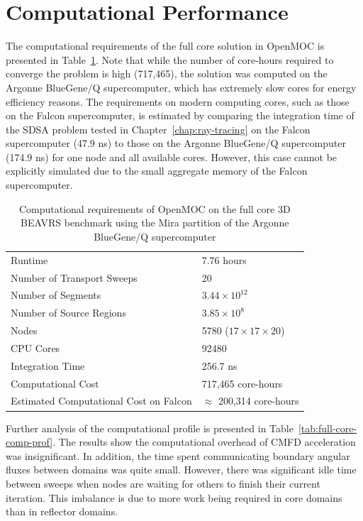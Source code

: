 \section{Computational Performance}
\label{sec:fc-computational-performance}

The computational requirements of the full core solution in OpenMOC is presented in Table~\ref{tab:full-core-comp-req}. Note that while the number of core-hours required to converge the problem is high (717,465), the solution was computed on the Argonne BlueGene/Q supercomputer, which has extremely slow cores for energy efficiency reasons. The requirements on modern computing cores, such as those on the Falcon supercomputer, is estimated by comparing the integration time of the SDSA problem tested in Chapter~\ref{chap:ray-tracing} on the Falcon supercomputer (47.9 ns) to those on the Argonne BlueGene/Q supercomputer (174.9 ns) for one node and all available cores. However, this case cannot be explicitly simulated due to the small aggregate memory of the Falcon supercomputer.

\begin{table}[ht]
	\centering
	\caption{Computational requirements of OpenMOC on the full core 3D BEAVRS benchmark using the Mira partition of the Argonne BlueGene/Q supercomputer}
	\medskip
	\begin{tabular}{l|l}
		\hline
		Runtime & 7.76 hours \\
		Number of Transport Sweeps & 20 \\
		Number of Segments & $3.44 \times 10^{12}$ \\
		Number of Source Regions & $3.85 \times 10^8$\\
		Nodes & 5780 ($17 \times 17 \times 20$) \\
		CPU Cores & 92480 \\
		Integration Time & 256.7 ns \\
		Computational Cost & 717,465 core-hours \\
		Estimated Computational Cost on Falcon & $\approx$ 200,314 core-hours \\
		\hline
	\end{tabular}
	\label{tab:full-core-comp-req}
\end{table}

Further analysis of the computational profile is presented in Table~\ref{tab:full-core-comp-prof}. The results show the computational overhead of CMFD acceleration was insignificant. In addition, the time spent communicating boundary angular fluxes between domains was quite small. However, there was significant idle time between sweeps when nodes are waiting for others to finish their current iteration. This imbalance is due to more work being required in core domains than in reflector domains.

